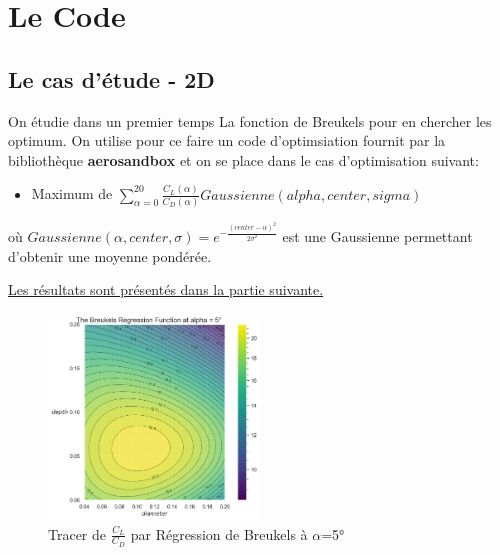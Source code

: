 
\chapter{Le Code} 	
\label{Chapter2} 		



\section{Le cas d'étude - 2D} 
\label{sec:Ch2.1}

On étudie dans un premier temps La fonction de Breukels pour en chercher les optimum. On utilise pour ce faire un code d'optimsiation fournit par la bibliothèque \textbf{aerosandbox} et on se place dans le cas d'optimisation suivant: 
\begin{itemize}
    \item Maximum de $\sum_{\alpha = 0}^{20}\frac{C_L(\alpha)}{C_D(\alpha)} Gaussienne(alpha, center, sigma) $
\end{itemize}

    où $Gaussienne(\alpha, center, \sigma) = e^{-\frac{(center - \alpha)^2}{2\sigma^2}}$ est une Gaussienne permettant d'obtenir une moyenne pondérée. 

\underline{Les résultats sont présentés dans la partie suivante.}
\begin{figure}[H]
    \centering
    \includegraphics[width=0.5\textwidth]{Pics/02 - Le code/breukels.png}  
    \caption{Tracer de $\frac{C_L}{C_D}$ par Régression de Breukels à $\alpha$=5°}
    \label{fig:breukels}
\end{figure}

